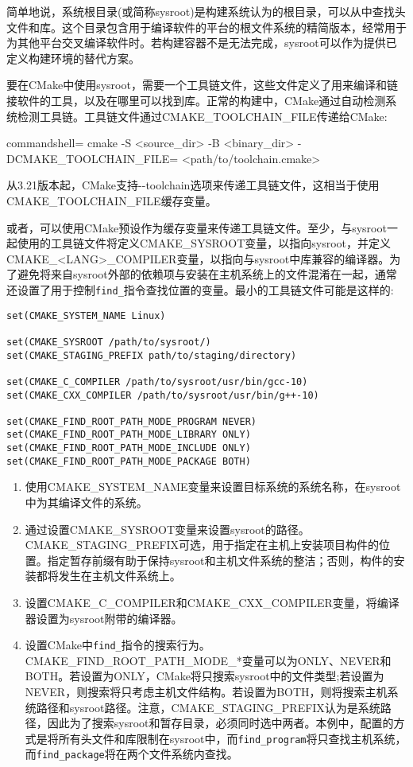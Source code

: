 简单地说，系统根目录(或简称sysroot)是构建系统认为的根目录，可以从中查找头文件和库。这个目录包含用于编译软件的平台的根文件系统的精简版本，经常用于为其他平台交叉编译软件时。若构建容器不是无法完成，sysroot可以作为提供已定义构建环境的替代方案。

要在CMake中使用sysroot，需要一个工具链文件，这些文件定义了用来编译和链接软件的工具，以及在哪里可以找到库。正常的构建中，CMake通过自动检测系统检测工具链。工具链文件通过CMAKE\_TOOLCHAIN\_FILE传递给CMake:

\begin{tcblisting}{commandshell={}}
cmake -S <source_dir> -B <binary_dir> -DCMAKE_TOOLCHAIN_FILE=
  <path/to/toolchain.cmake>
\end{tcblisting}

从3.21版本起，CMake支持-{}-toolchain选项来传递工具链文件，这相当于使用CMAKE\_TOOLCHAIN\_FILE缓存变量。

或者，可以使用CMake预设作为缓存变量来传递工具链文件。至少，与sysroot一起使用的工具链文件将定义CMAKE\_SYSROOT变量，以指向sysroot，并定义CMAKE\_<LANG>\_COMPILER变量，以指向与sysroot中库兼容的编译器。为了避免将来自sysroot外部的依赖项与安装在主机系统上的文件混淆在一起，通常还设置了用于控制\texttt{find\_}指令查找位置的变量。最小的工具链文件可能是这样的:

\begin{lstlisting}[style=styleCMake]
set(CMAKE_SYSTEM_NAME Linux)

set(CMAKE_SYSROOT /path/to/sysroot/)
set(CMAKE_STAGING_PREFIX path/to/staging/directory)

set(CMAKE_C_COMPILER /path/to/sysroot/usr/bin/gcc-10)
set(CMAKE_CXX_COMPILER /path/to/sysroot/usr/bin/g++-10)

set(CMAKE_FIND_ROOT_PATH_MODE_PROGRAM NEVER)
set(CMAKE_FIND_ROOT_PATH_MODE_LIBRARY ONLY)
set(CMAKE_FIND_ROOT_PATH_MODE_INCLUDE ONLY)
set(CMAKE_FIND_ROOT_PATH_MODE_PACKAGE BOTH)
\end{lstlisting}

\begin{enumerate}
\item 
使用CMAKE\_SYSTEM\_NAME变量来设置目标系统的系统名称，在sysroot中为其编译文件的系统。

\item 
通过设置CMAKE\_SYSROOT变量来设置sysroot的路径。CMAKE\_STAGING\_PREFIX可选，用于指定在主机上安装项目构件的位置。指定暂存前缀有助于保持sysroot和主机文件系统的整洁；否则，构件的安装都将发生在主机文件系统上。

\item 
设置CMAKE\_C\_COMPILER和CMAKE\_CXX\_COMPILER变量，将编译器设置为sysroot附带的编译器。

\item 
设置CMake中\texttt{find\_}指令的搜索行为。CMAKE\_FIND\_ROOT\_PATH\_MODE\_*变量可以为ONLY、NEVER和BOTH。若设置为ONLY，CMake将只搜索sysroot中的文件类型;若设置为NEVER，则搜索将只考虑主机文件结构。若设置为BOTH，则将搜索主机系统路径和sysroot路径。注意，CMAKE\_STAGING\_PREFIX认为是系统路径，因此为了搜索sysroot和暂存目录，必须同时选中两者。本例中，配置的方式是将所有头文件和库限制在sysroot中，而\texttt{find\_program}将只查找主机系统，而\texttt{find\_package}将在两个文件系统内查找。
\end{enumerate}

